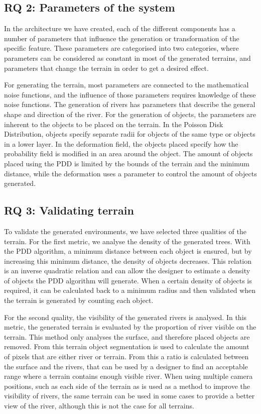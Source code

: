 \subsection{RQ 2: Parameters of the system}
In the architecture we have created, each of the different components has a number of parameters that influence the generation or transformation of the specific feature. These parameters are categorised into two categories, where parameters can be considered as constant in most of the generated terrains, and parameters that change the terrain in order to get a desired effect.

For generating the terrain, most parameters are connected to the mathematical noise functions, and the influence of those parameters requires knowledge of these noise functions. The generation of rivers has parameters that describe the general shape and direction of the river. For the generation of objects, the parameters are inherent to the objects to be placed on the terrain. In the Poisson Disk Distribution, objects specify separate radii for objects of the same type or objects in a lower layer. In the deformation field, the objects placed specify how the probability field is modified in an area around the object. The amount of objects placed using the PDD is limited by the bounds of the terrain and the minimum distance, while the deformation uses a parameter to control the amount of objects generated.

\subsection{RQ 3: Validating terrain}
To validate the generated environments, we have selected three qualities of the terrain. For the first metric, we analyse the density of the generated trees. With the PDD algorithm, a minimum distance between each object is ensured, but by increasing this minimum distance, the density of objects decreases. This relation is an inverse quadratic relation and can allow the designer to estimate a density of objects the PDD algorithm will generate. When a certain density of objects is required, it can be calculated back to a minimum radius and then validated when the terrain is generated by counting each object.

For the second quality, the visibility of the generated rivers is analysed. In this metric, the generated terrain is evaluated by the proportion of river visible on the terrain. This method only analyses the surface, and therefore placed objects are removed. From this terrain object segmentation is used to calculate the amount of pixels that are either river or terrain. From this a ratio is calculated between the surface and the rivers, that can be used by a designer to find an acceptable range where a terrain contains enough visible river. When using multiple camera positions, such as each side of the terrain as is used as a method to improve the visibility of rivers, the same terrain can be used in some cases to provide a better view of the river, although this is not the case for all terrains.

